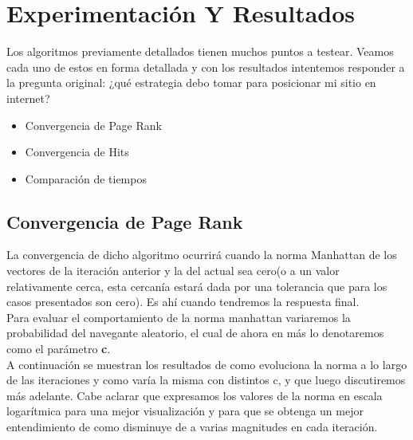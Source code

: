 \section{Experimentación Y Resultados}

  Los algoritmos previamente detallados tienen muchos puntos a testear. Veamos cada uno de estos en forma detallada y con los resultados intentemos responder a la pregunta original: ¿qué estrategia debo tomar para posicionar mi sitio en internet?

  \begin{itemize}
    \item{Convergencia de Page Rank}
    \item{Convergencia de Hits}
    \item{Comparación de tiempos}
  \end{itemize}


% 

\subsection{Convergencia de Page Rank} 

La convergencia de dicho algoritmo ocurrirá cuando la norma Manhattan de los vectores de la iteración anterior y la del actual sea cero(o a un valor relativamente cerca, esta cercanía estará dada por una tolerancia que para los casos presentados son cero). Es ahí cuando tendremos la respuesta final.\\
Para evaluar el comportamiento de la norma manhattan variaremos la probabilidad del navegante aleatorio, el cual de ahora en más lo denotaremos como el parámetro \textbf{c}.\\
A continuación se muestran los resultados de como evoluciona la norma a lo largo de las iteraciones y como varía la misma con distintos c, y que luego discutiremos más adelante.
Cabe aclarar que expresamos los valores de la norma en escala logarítmica para una mejor visualización y para que se obtenga un mejor entendimiento de como disminuye de a varias magnitudes en cada iteración.


